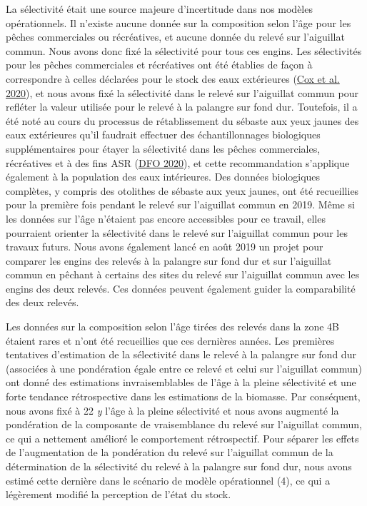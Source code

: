 \documentclass[french,11pt]{book}
\begin{document}
La sélectivité était une source majeure d'incertitude dans nos modèles opérationnels. Il n'existe aucune donnée sur la composition selon l'âge pour les pêches commerciales ou récréatives, et aucune donnée du relevé sur l'aiguillat commun. Nous avons donc fixé la sélectivité pour tous ces engins. Les sélectivités pour les pêches commerciales et récréatives ont été établies de façon à correspondre à celles déclarées pour le stock des eaux extérieures (\protect\hyperlink{ref-cox2020}{Cox et al. 2020}), et nous avons fixé la sélectivité dans le relevé sur l'aiguillat commun pour refléter la valeur utilisée pour le relevé à la palangre sur fond dur. Toutefois, il a été noté au cours du processus de rétablissement du sébaste aux yeux jaunes des eaux extérieures qu'il faudrait effectuer des échantillonnages biologiques supplémentaires pour étayer la sélectivité dans les pêches commerciales, récréatives et à des fins ASR (\protect\hyperlink{ref-dfo2020}{DFO 2020}), et cette recommandation s'applique également à la population des eaux intérieures. Des données biologiques complètes, y compris des otolithes de sébaste aux yeux jaunes, ont été recueillies pour la première fois pendant le relevé sur l'aiguillat commun en 2019. Même si les données sur l'âge n'étaient pas encore accessibles pour ce travail, elles pourraient orienter la sélectivité dans le relevé sur l'aiguillat commun pour les travaux futurs. Nous avons également lancé en août 2019 un projet pour comparer les engins des relevés à la palangre sur fond dur et sur l'aiguillat commun en pêchant à certains des sites du relevé sur l'aiguillat commun avec les engins des deux relevés. Ces données peuvent également guider la comparabilité des deux relevés.

Les données sur la composition selon l'âge tirées des relevés dans la zone 4B étaient rares et n'ont été recueillies que ces dernières années. Les premières tentatives d'estimation de la sélectivité dans le relevé à la palangre sur fond dur (associées à une pondération égale entre ce relevé et celui sur l'aiguillat commun) ont donné des estimations invraisemblables de l'âge à la pleine sélectivité et une forte tendance rétrospective dans les estimations de la biomasse. Par conséquent, nous avons fixé à 22 \emph{y} l'âge à la pleine sélectivité et nous avons augmenté la pondération de la composante de vraisemblance du relevé sur l'aiguillat commun, ce qui a nettement amélioré le comportement rétrospectif. Pour séparer les effets de l'augmentation de la pondération du relevé sur l'aiguillat commun de la détermination de la sélectivité du relevé à la palangre sur fond dur, nous avons estimé cette dernière dans le scénario de modèle opérationnel (4), ce qui a légèrement modifié la perception de l'état du stock.
\end{document}
